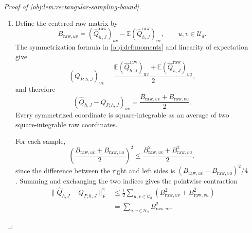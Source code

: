 \begin{proof}[Proof of \cref{obj:lem:rectangular-sampling-bound}]
\begin{enumerate}
\item Define the centered raw matrix by
\[
B_{\mathrm{raw},uv}
=(\widehat Q^{\mathrm{raw}}_{h,J})_{uv}
 -\mathbb E(\widehat Q^{\mathrm{raw}}_{h,J})_{uv},
\qquad u,v\in\mathcal U_d.
\]
The symmetrization formula in \cref{obj:def:moments} and linearity of expectation give
\[
(Q_{P,h,J})_{uv}
=\frac{
 \mathbb E(\widehat Q^{\mathrm{raw}}_{h,J})_{uv}
 +\mathbb E(\widehat Q^{\mathrm{raw}}_{h,J})_{vu}}2,
\]
and therefore
\[
(\widehat Q_{h,J}-Q_{P,h,J})_{uv}
=\frac{B_{\mathrm{raw},uv}+B_{\mathrm{raw},vu}}2.
\]
Every symmetrized coordinate is square-integrable as an average of two square-integrable raw coordinates.

For each sample,
\[
\left(\frac{B_{\mathrm{raw},uv}+B_{\mathrm{raw},vu}}2\right)^2
\le\frac{B_{\mathrm{raw},uv}^2+B_{\mathrm{raw},vu}^2}{2},
\]
since the difference between the right and left sides is
\((B_{\mathrm{raw},uv}-B_{\mathrm{raw},vu})^2/4\). Summing and exchanging the two indices gives the pointwise contraction
\[
\begin{aligned}
\|\widehat Q_{h,J}-Q_{P,h,J}\|_F^2
&\le\frac12\sum_{u,v\in\mathcal U_d}
 \left(B_{\mathrm{raw},uv}^2+B_{\mathrm{raw},vu}^2\right)\\
&=\sum_{u,v\in\mathcal U_d}B_{\mathrm{raw},uv}^2.
\end{aligned}
\]


\end{enumerate}
\end{proof}
